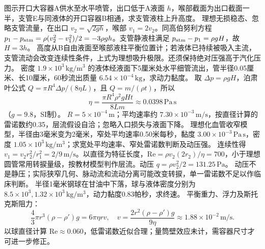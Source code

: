 \problemtext 图示开口大容器A供水至水平喷管，出口低于A液面 $h$，喉部截面为出口截面一半，支管E与同液体的开口容器B相通，求支管液柱上升高度。
\workings 理想无损稳态、忽略支管流量，在出口 $v_2=\sqrt{2gh}$，喉部 $v_1=2v_2$。同高伯努利方程 $p_1-p_{\rm atm}=\rho(v_2^2-v_1^2)/2=-3\rho gh$。支管静液柱满足 $p_{\rm atm}-p_1=\rho gH$，故 $H=3h$。
\crosscheck 高度从B自由液面至喉部液柱平衡位置计；若液体已持续被吸入主流，支管流动会改变连续性条件，上式为理想吸升极限。还须保持绝对压强高于汽化压力。
\problemtext 密度 $1.9\times10^3\,\mathrm{kg/m^3}$ 的液体经液面下5厘米处水平细管流出，管半径0.05厘米、长10厘米，60秒流出质量 $6.54\times10^{-4}\,\mathrm{kg}$，求动力黏度。
\workings 取 $\Delta p=\rho gH$，泊肃叶公式 $Q=\pi R^4\Delta p/(8\eta L)$，且 $Q=m/(\rho t)$，所以
\[
\eta=\frac{\pi R^4\rho^2gHt}{8Lm}\approx0.0398\,\mathrm{Pa\,s}
\]
（$g=9.8$，SI制）。
\crosscheck $R=5\times10^{-4}\,\mathrm m$；平均速率约 $7.30\times10^{-3}\,\mathrm{m/s}$，按直径计算的雷诺数约0.35，层流假设自洽；忽略入口损失与液面下降。
\problemtext 理想化血管收窄模型，半径由3毫米变为2毫米，窄处平均速率0.50米每秒，黏度 $3.00\times10^{-3}\,\mathrm{Pa\,s}$，密度 $1.05\times10^3\,\mathrm{kg/m^3}$；求宽处平均速率、窄处雷诺数判断及动压强。
\workings 连续性得 $v_1=v_2r_2^2/r_1^2=2/9\,\mathrm{m/s}$。以直径为特征长度，$\mathrm{Re}=\rho v_2(2r_2)/\eta=700$，小于理想圆管常用转捩量级，按教材模型判作层流。动压 $q=\rho v_2^2/2=131.25\,\mathrm{Pa}$。
\crosscheck 动压不是静压；实际狭窄几何、脉动流和流动分离可能改变转捩，单一雷诺数不足以作临床判断。
\problemtext 半径1毫米钢球在甘油中下落，球与液体密度分别为 $8.5\times10^3,1.32\times10^3\,\mathrm{kg/m^3}$，动力黏度0.83帕秒，求终速。
\workings 平衡重力、浮力及斯托克斯阻力：
\[
\frac43\pi r^3(\rho-\rho')g=6\pi\eta rv,\quad
v=\frac{2r^2(\rho-\rho')g}{9\eta}\approx1.88\times10^{-2}\,\mathrm{m/s}.
\]
\crosscheck 以球直径计算 $\mathrm{Re}\approx0.060$，低雷诺数近似合理；量筒壁效应未计，需容器尺寸才可进一步修正。

